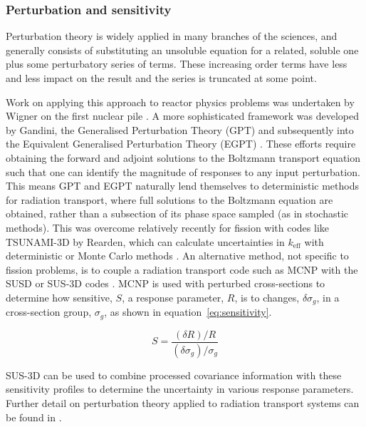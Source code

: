 \subsubsection{Perturbation and sensitivity}
Perturbation theory is widely applied in many branches of the sciences, and generally consists of substituting an unsoluble equation for a related, soluble one plus some perturbatory series of terms. These increasing order terms have less and less impact on the result and the series is truncated at some point. 

Work on applying this approach to reactor physics problems was undertaken by Wigner on the first nuclear pile \cite{Rising2012}. A more sophisticated framework was developed by Gandini, the Generalised Perturbation Theory (GPT) \cite{Gandini1967} and subsequently into the Equivalent Generalised Perturbation Theory (EGPT) \cite{Gandini1986}. These efforts require obtaining the forward and adjoint solutions to the Boltzmann transport equation such that one can identify the magnitude of responses to any input perturbation. This means GPT and EGPT naturally lend themselves to deterministic methods for radiation transport, where full solutions to the Boltzmann equation are obtained, rather than a subsection of its phase space sampled (as in stochastic methods). This was overcome relatively recently for fission with codes like TSUNAMI-3D by Rearden, which can calculate uncertainties in $k_{\mathrm{eff}}$ with deterministic or Monte Carlo methods \cite{Rearden2004}. An alternative method, not specific to fission problems, is to couple a radiation transport code such as MCNP \cite{goorley2012} with the SUSD or SUS-3D codes \cite{Kodeli2001}. MCNP is used with perturbed cross-sections to determine how sensitive, $S$, a response parameter, $R$, is to changes, $\delta \sigma_{g}$, in a cross-section group, $\sigma_{g}$, as shown in equation~\ref{eq:sensitivity}. 

\begin{equation}
  \label{eq:sensitivity}
  S = \frac{(\delta R)/R}{(\delta \sigma_{g}) / \sigma_{g}}
\end{equation}

SUS-3D can be used to combine processed covariance information with these sensitivity profiles to determine the uncertainty in various response parameters. Further detail on perturbation theory applied to radiation transport systems can be found in \cite{Sabouri2013}.

